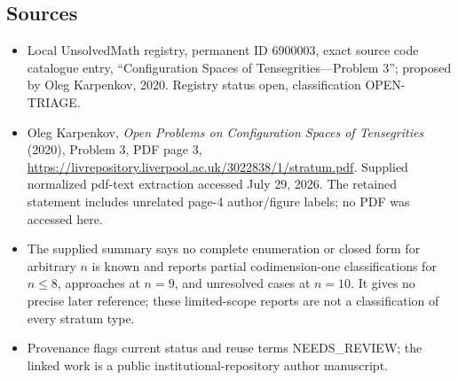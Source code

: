 \documentclass[11pt]{article}
\begin{document}
\subsection{Sources}
\begin{itemize}
\item Local UnsolvedMath registry, permanent ID 6900003, exact source code catalogue entry, ``Configuration Spaces of Tensegrities---Problem 3''; proposed by Oleg Karpenkov, 2020. Registry status open, classification OPEN-TRIAGE.
\item Oleg Karpenkov, \emph{Open Problems on Configuration Spaces of Tensegrities} (2020), Problem 3, PDF page 3, \url{https://livrepository.liverpool.ac.uk/3022838/1/stratum.pdf}. Supplied normalized pdf-text extraction accessed July 29, 2026. The retained statement includes unrelated page-4 author/figure labels; no PDF was accessed here.
\item The supplied summary says no complete enumeration or closed form for arbitrary $n$ is known and reports partial codimension-one classifications for $n\leq8$, approaches at $n=9$, and unresolved cases at $n=10$. It gives no precise later reference; these limited-scope reports are not a classification of every stratum type.
\item Provenance flags current status and reuse terms NEEDS\_REVIEW; the linked work is a public institutional-repository author manuscript.
\end{itemize}
\end{document}

